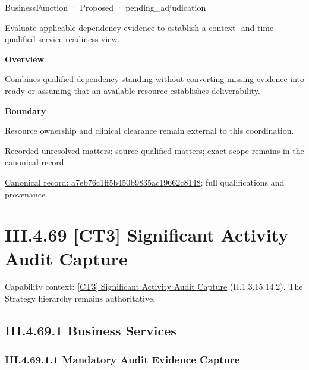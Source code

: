 \label{element:a7eb76c1ff5b450b9835ac19662c8148}
{\small BusinessFunction · Proposed · pending\_adjudication}\par

Evaluate applicable dependency evidence to establish a context- and time-qualified service readiness view.



\textbf{Overview}



Combines qualified dependency standing without converting missing evidence into ready or assuming that an available resource establishes deliverability.



\textbf{Boundary}



Resource ownership and clinical clearance remain external to this coordination.


{\small Recorded unresolved matters: source-qualified matters; exact scope remains in the canonical record.}\par
{\footnotesize \href{../../../../continuum/business/business-function/a7eb76c1ff5b450b9835ac19662c8148.md}{Canonical record: a7eb76c1ff5b450b9835ac19662c8148}; full qualifications and provenance.}\par
\section*{III.4.69 [CT3] Significant Activity Audit Capture}
\label{navigation:III.4.69}

{\small Capability context: \hyperref[element:d903948169eb4785b0f03d916c842a8a]{[CT3] Significant Activity Audit Capture} (II.1.3.15.14.2). The Strategy hierarchy remains authoritative.}\par
\subsection*{III.4.69.1 Business Services}
\label{navigation:III.4.69.1}

\subsubsection*{III.4.69.1.1 Mandatory Audit Evidence Capture}
\label{navigation:III.4.69.1.1}

